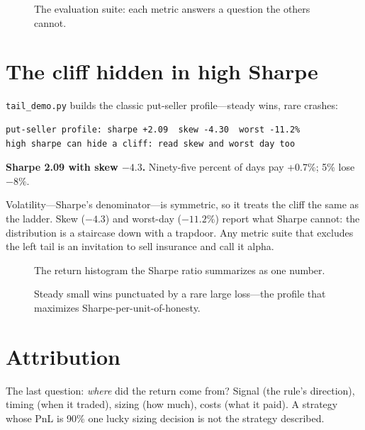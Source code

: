 \begin{figure}[htbp]\centering

\caption{The evaluation suite: each metric answers a question the others cannot.}
\label{fig:metrics}
\end{figure}

\section{The cliff hidden in high Sharpe}\label{sec:cliff}

\texttt{tail\_demo.py} builds the classic put-seller profile---steady wins, rare crashes:
\begin{lstlisting}[numbers=none]
put-seller profile: sharpe +2.09  skew -4.30  worst -11.2%
high sharpe can hide a cliff: read skew and worst day too
\end{lstlisting}

\begin{example}\label{ex:cliff}
\textbf{Sharpe 2.09 with skew $-4.3$.} Ninety-five percent of days pay +0.7\%; 5\% lose
$-8\%$.
\begin{solution}
Volatility---Sharpe's denominator---is symmetric, so it treats the cliff the same as the
ladder. Skew ($-4.3$) and worst-day ($-11.2\%$) report what Sharpe cannot: the distribution
is a staircase down with a trapdoor. Any metric suite that excludes the left tail is an
invitation to sell insurance and call it alpha.
\end{solution}
\end{example}

\begin{figure}[htbp]\centering

\caption{The return histogram the Sharpe ratio summarizes as one number.}
\label{fig:tailhist}
\end{figure}

\begin{figure}[htbp]\centering

\caption{Steady small wins punctuated by a rare large loss---the profile that maximizes
Sharpe-per-unit-of-honesty.}
\label{fig:cliff}
\end{figure}

\section{Attribution}\label{sec:attr}

The last question: \emph{where} did the return come from? Signal (the rule's direction),
timing (when it traded), sizing (how much), costs (what it paid). A strategy whose PnL is
90\% one lucky sizing decision is not the strategy described.

